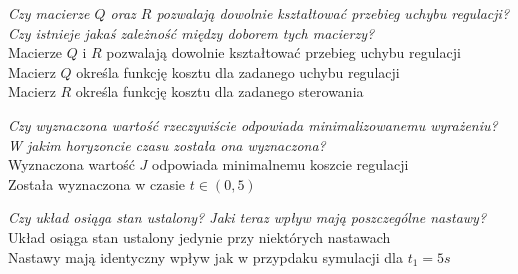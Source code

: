 \documentclass[12pt, letterpaper]{article}
\begin{document}
\begin{enumerate}

            \emph{Czy macierze $Q$ oraz $R$ pozwalają dowolnie kształtować przebieg uchybu regulacji?
            Czy istnieje jakaś zależność między doborem tych macierzy?}\\
            Macierze $Q$ i $R$ pozwalają dowolnie kształtować przebieg uchybu regulacji\\
            Macierz $Q$ określa funkcję kosztu dla zadanego uchybu regulacji\\
            Macierz $R$ określa funkcję kosztu dla zadanego sterowania


            \emph{Czy wyznaczona wartość rzeczywiście odpowiada minimalizowanemu wyrażeniu?
            W jakim horyzoncie czasu została ona wyznaczona?}\\
            Wyznaczona wartość $J$ odpowiada minimalnemu koszcie regulacji\\
            Została wyznaczona w czasie $t\in(0, 5)$


            \emph{Czy układ osiąga stan ustalony? Jaki teraz wpływ mają poszczególne nastawy?}\\
            Układ osiąga stan ustalony jedynie przy niektórych nastawach\\
            Nastawy mają identyczny wpływ jak w przypdaku symulacji dla $t_1=5s$
            
    \end{enumerate}
\end{document}
